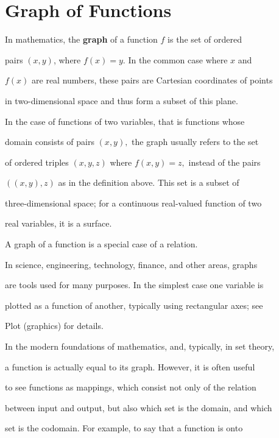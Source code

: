 \section{Graph of Functions}
\label{sec:graph-of-functions}

In mathematics, the \textbf{graph} of a function $f$ is the set of ordered

pairs $(x, y)$, where $f(x) = y.$ In the common case where $x$ and

$f(x)$ are real numbers, these pairs are Cartesian coordinates of points

in two-dimensional space and thus form a subset of this plane.



In the case of functions of two variables, that is functions whose

domain consists of pairs $(x, y),$ the graph usually refers to the set

of ordered triples $(x, y, z)$ where $f(x,y) = z,$ instead of the pairs

$((x, y), z)$ as in the definition above. This set is a subset of

three-dimensional space; for a continuous real-valued function of two

real variables, it is a surface.



A graph of a function is a special case of a relation.



In science, engineering, technology, finance, and other areas, graphs

are tools used for many purposes. In the simplest case one variable is

plotted as a function of another, typically using rectangular axes; see

Plot (graphics) for details.



In the modern foundations of mathematics, and, typically, in set theory,

a function is actually equal to its graph. However, it is often useful

to see functions as mappings, which consist not only of the relation

between input and output, but also which set is the domain, and which

set is the codomain. For example, to say that a function is onto

